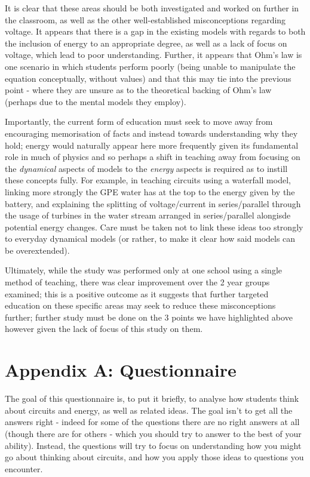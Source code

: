 \documentclass[a4paper,openany,nobib]{tufte-book}
\begin{document}
It is clear that these areas should be both investigated and worked on further in the classroom, as well as the other well-established misconceptions regarding voltage. It appears that there is a gap in the existing models with regards to both the inclusion of energy to an appropriate degree, as well as a lack of focus on voltage, which lead to poor understanding. Further, it appears that Ohm's law is one scenario in which students perform poorly (being unable to manipulate the equation conceptually, without values) and that this may tie into the previous point - where they are unsure as to the theoretical backing of Ohm's law (perhaps due to the mental models they employ).

Importantly, the current form of education must seek to move away from encouraging memorisation of facts and instead towards understanding why they hold; energy would naturally appear here more frequently given its fundamental role in much of physics and so perhaps a shift in teaching away from focusing on the \emph{dynamical} aspects of models to the \emph{energy} aspects is required as to instill these concepts fully. For example, in teaching circuits using a waterfall model, linking more strongly the GPE water has at the top to the energy given by the battery, and explaining the splitting of voltage/current in series/parallel through the usage of turbines in the water stream arranged in series/parallel alongisde potential energy changes. Care must be taken not to link these ideas too strongly to everyday dynamical models (or rather, to make it clear how said models can be overextended).

Ultimately, while the study was performed only at one school using a single method of teaching, there was clear improvement over the 2 year groups examined; this is a positive outcome as it suggests that further targeted education on these specific areas may seek to reduce these misconceptions further; further study must be done on the 3 points we have highlighted above however given the lack of focus of this study on them.
\backmatter
\chapter{Appendix A: Questionnaire}
The goal of this questionnaire is, to put it briefly, to analyse how students think about circuits and energy, as well as related ideas. The goal isn't to get all the answers right - indeed for some of the questions there are no right answers at all (though there are for others - which you should try to answer to the best of your ability). Instead, the questions will try to focus on understanding how you might go about thinking about circuits, and how you apply those ideas to questions you encounter.
\end{document}

